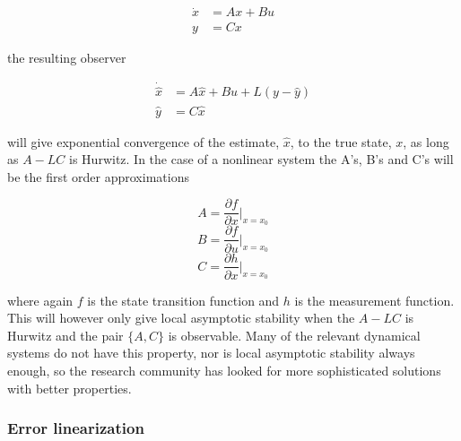 \begin{align}
    \Dot{x} &= Ax + Bu \\
    y &= Cx
\end{align}

the resulting observer

\begin{align}
    \Dot{\hat{x}} &= A\hat{x} + Bu + L(y - \hat{y}) \\
    \hat{y} &= C\hat{x}
\end{align}

will give exponential convergence of the estimate, $\hat{x}$, to the true state, $x$, as long as $A-LC$ is Hurwitz\cite{Hurwitz}. In the case of a nonlinear system the A's, B's and C's will be the first order approximations

\begin{equation}
    A = \frac{\partial f}{\partial x}|_{x=x_0}
\end{equation}
\begin{equation}
    B = \frac{\partial f}{\partial u}|_{x=x_0}
\end{equation}
\begin{equation}
    C = \frac{\partial h}{\partial x}|_{x=x_0}
\end{equation}

where again $f$ is the state transition function and $h$ is the measurement function. This will however only give local asymptotic stability when the $A-LC$ is Hurwitz and the pair $\{A,C\}$ is observable. Many of the relevant dynamical systems do not have this property, nor is local asymptotic stability always enough, so the research community has looked for more sophisticated solutions with better properties. 

\subsubsection{Error linearization}

